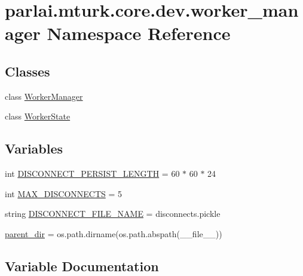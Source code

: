 \hypertarget{namespaceparlai_1_1mturk_1_1core_1_1dev_1_1worker__manager}{}\section{parlai.\+mturk.\+core.\+dev.\+worker\+\_\+manager Namespace Reference}
\label{namespaceparlai_1_1mturk_1_1core_1_1dev_1_1worker__manager}
\subsection*{Classes}
\begin{DoxyCompactItemize}
\item 
class \hyperlink{classparlai_1_1mturk_1_1core_1_1dev_1_1worker__manager_1_1WorkerManager}{Worker\+Manager}
\item 
class \hyperlink{classparlai_1_1mturk_1_1core_1_1dev_1_1worker__manager_1_1WorkerState}{Worker\+State}
\end{DoxyCompactItemize}
\subsection*{Variables}
\begin{DoxyCompactItemize}
\item 
int \hyperlink{namespaceparlai_1_1mturk_1_1core_1_1dev_1_1worker__manager_ac8ec6a06a69c73326990c0bffa080810}{D\+I\+S\+C\+O\+N\+N\+E\+C\+T\+\_\+\+P\+E\+R\+S\+I\+S\+T\+\_\+\+L\+E\+N\+G\+TH} = 60 $\ast$ 60 $\ast$ 24
\item 
int \hyperlink{namespaceparlai_1_1mturk_1_1core_1_1dev_1_1worker__manager_a8f9c4fb085b8c5a0dbbbf9c899b9f73a}{M\+A\+X\+\_\+\+D\+I\+S\+C\+O\+N\+N\+E\+C\+TS} = 5
\item 
string \hyperlink{namespaceparlai_1_1mturk_1_1core_1_1dev_1_1worker__manager_a2695ad4a3dad29f94ad7a8cce4b15b83}{D\+I\+S\+C\+O\+N\+N\+E\+C\+T\+\_\+\+F\+I\+L\+E\+\_\+\+N\+A\+ME} = \textquotesingle{}disconnects.\+pickle\textquotesingle{}
\item 
\hyperlink{namespaceparlai_1_1mturk_1_1core_1_1dev_1_1worker__manager_a5689f22f8500b82744c68ec513a45972}{parent\+\_\+dir} = os.\+path.\+dirname(os.\+path.\+abspath(\+\_\+\+\_\+file\+\_\+\+\_\+))
\end{DoxyCompactItemize}


\subsection{Variable Documentation}
\mbox{\label{namespaceparlai_1_1mturk_1_1core_1_1dev_1_1worker__manager_a2695ad4a3dad29f94ad7a8cce4b15b83}} 

